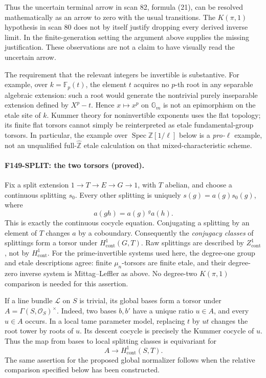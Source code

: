 Thus the uncertain terminal arrow in scan 82, formula (21), can be
resolved mathematically as an arrow to zero with the usual transitions.
The \(K(\pi,1)\) hypothesis in scan 80 does not by itself justify dropping
every derived inverse limit.  In the finite-generation setting the
argument above supplies the missing justification.  These observations
are not a claim to have visually read the uncertain arrow.

The requirement that the relevant integers be invertible is substantive.
For example, over \(k=\mathbb F_p(t)\), the element \(t\) acquires no
\(p\)-th root in any separable algebraic extension: such a root would
generate the nontrivial purely inseparable extension defined by
\(X^p-t\).  Hence \(x\mapsto x^p\) on \(\mathbb G_m\) is not an epimorphism
on the etale site of \(k\).  Kummer theory for noninvertible exponents
uses the flat topology; its finite flat torsors cannot simply be
reinterpreted as etale fundamental-group torsors.  In particular, the
example over \(\operatorname{Spec}\mathbb Z[1/\ell]\) below is a
\emph{pro-\(\ell\)} example, not an unqualified full-\(\widehat{\mathbb Z}\)
etale calculation on that mixed-characteristic scheme.

\paragraph{F149-SPLIT: the two torsors (proved).}
Fix a split extension \(1\to T\to E\to G\to1\), with \(T\) abelian,
and choose a continuous splitting \(s_0\).  Every other splitting is
uniquely \(s(g)=a(g)s_0(g)\), where
\[
 a(gh)=a(g)\,{}^ga(h).
\]
This is exactly the continuous cocycle equation.  Conjugating a
splitting by an element of \(T\) changes \(a\) by a coboundary.
Consequently the \emph{conjugacy classes} of splittings form a torsor
under \(H^1_{\mathrm{cont}}(G,T)\).  Raw splittings are described by
\(Z^1_{\mathrm{cont}}\), not by \(H^1_{\mathrm{cont}}\).
For the prime-invertible systems used here, the degree-one group and
etale descriptions agree: finite \(\mu_n\)-torsors are finite etale,
and their degree-zero inverse system is Mittag--Leffler as above.
No degree-two \(K(\pi,1)\) comparison is needed for this assertion.

If a line bundle \(\mathcal L\) on \(S\) is trivial, its global bases form
a torsor under \(A=\Gamma(S,\mathcal O_S)^\times\).  Indeed, two bases
\(b,b'\) have a unique ratio \(u\in A\), and every \(u\in A\) occurs.
In a local tame parameter model, replacing \(t\) by \(ut\) changes the
root tower by roots of \(u\).  Its descent cocycle is precisely the
Kummer cocycle of \(u\).  Thus the map from bases to local splitting
classes is equivariant for
\[
 A\longrightarrow H^1_{\mathrm{cont}}(S,T).
\]
The same assertion for the proposed global normalizer follows when the
relative comparison specified below has been constructed.

